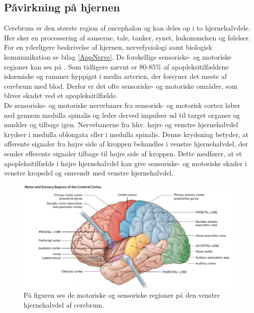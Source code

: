 \subsection{Påvirkning på hjernen}

Cerebrum er den største region af encephalon og kan deles op i to hjernehalvdele. Her sker en processering af sanserne, tale, tanker, synet, hukommelsen og følelser. \cite{Martini2012} For en yderligere beskrivelse af hjernen, nervefysiologi samt biologisk kommunikation se bilag \ref{AppNerve}. De forskellige sensoriske- og motoriske regioner kan ses på . Som tidligere nævnt er 80-85\% af apopleksitilfældene iskæmiske og rammer hyppigst i media arterien, der forsyner det meste af cerebrum med blod. Derfor er det ofte sensoriske- og motoriske områder, som bliver skadet ved et apopleksitilfælde. \cite{Sundhed.dk,Gade2004,Boss2010} \\
De sensoriske- og motoriske nervebaner fra sensorisk- og motorisk cortex løber ned gennem medulla spinalis og leder derved impulser ud til target organer og muskler og tilbage igen. Nervebanerne fra hhv. højre og venstre hjernehalvdel krydser i medulla oblongata eller i medulla spinalis. Denne krydsning betyder, at afferente signaler fra højre side af kroppen behandles i venstre hjernehalvdel, der sender efferente signaler tilbage til højre side af kroppen. \cite{Martini2012,Stanfield2014} Dette medfører, at et apopleksitilfælde i højre hjernehalvdel kan give sensoriske- og motoriske skader i venstre kropsdel og omvendt med venstre hjernehalvdel. \cite{Sundhedsstyrelsen2009,Nichols1997} %


\begin{figure}[H]
	\centering
	\includegraphics[scale=0.6]{figures/bProblemanalyse/Encephalon.png}
	\caption{På figuren ses de motoriske og sensoriske regioner på den venstre hjernehalvdel af cerebrum. \cite{Martini2012}}
	\label{Enc}
\end{figure}


